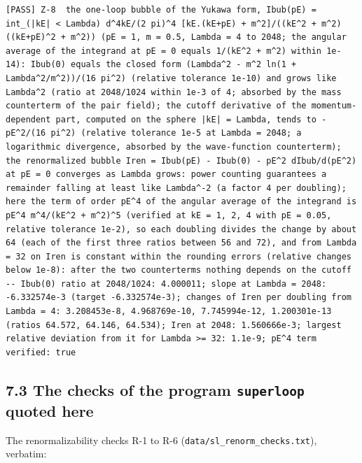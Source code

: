 \documentclass[
  10pt,
]{article}
\begin{document}
\begin{verbatim}
[PASS] Z-8  the one-loop bubble of the Yukawa form, Ibub(pE) = int_(|kE| < Lambda) d^4kE/(2 pi)^4 [kE.(kE+pE) + m^2]/((kE^2 + m^2)((kE+pE)^2 + m^2)) (pE = 1, m = 0.5, Lambda = 4 to 2048; the angular average of the integrand at pE = 0 equals 1/(kE^2 + m^2) within 1e-14): Ibub(0) equals the closed form (Lambda^2 - m^2 ln(1 + Lambda^2/m^2))/(16 pi^2) (relative tolerance 1e-10) and grows like Lambda^2 (ratio at 2048/1024 within 1e-3 of 4; absorbed by the mass counterterm of the pair field); the cutoff derivative of the momentum-dependent part, computed on the sphere |kE| = Lambda, tends to -pE^2/(16 pi^2) (relative tolerance 1e-5 at Lambda = 2048; a logarithmic divergence, absorbed by the wave-function counterterm); the renormalized bubble Iren = Ibub(pE) - Ibub(0) - pE^2 dIbub/d(pE^2) at pE = 0 converges as Lambda grows: power counting guarantees a remainder falling at least like Lambda^-2 (a factor 4 per doubling); here the term of order pE^4 of the angular average of the integrand is pE^4 m^4/(kE^2 + m^2)^5 (verified at kE = 1, 2, 4 with pE = 0.05, relative tolerance 1e-2), so each doubling divides the change by about 64 (each of the first three ratios between 56 and 72), and from Lambda = 32 on Iren is constant within the rounding errors (relative changes below 1e-8): after the two counterterms nothing depends on the cutoff  -- Ibub(0) ratio at 2048/1024: 4.000011; slope at Lambda = 2048: -6.332574e-3 (target -6.332574e-3); changes of Iren per doubling from Lambda = 4: 3.208453e-8, 4.968769e-10, 7.745994e-12, 1.200301e-13 (ratios 64.572, 64.146, 64.534); Iren at 2048: 1.560666e-3; largest relative deviation from it for Lambda >= 32: 1.1e-9; pE^4 term verified: true
\end{verbatim}

\hypertarget{the-checks-of-the-program-superloop-quoted-here}{%
\subsection{\texorpdfstring{7.3 The checks of the program
\texttt{superloop} quoted
here}{7.3 The checks of the program superloop quoted here}}\label{the-checks-of-the-program-superloop-quoted-here}}

The renormalizability checks R-1 to R-6
(\texttt{data/sl\_renorm\_checks.txt}), verbatim:
\end{document}
